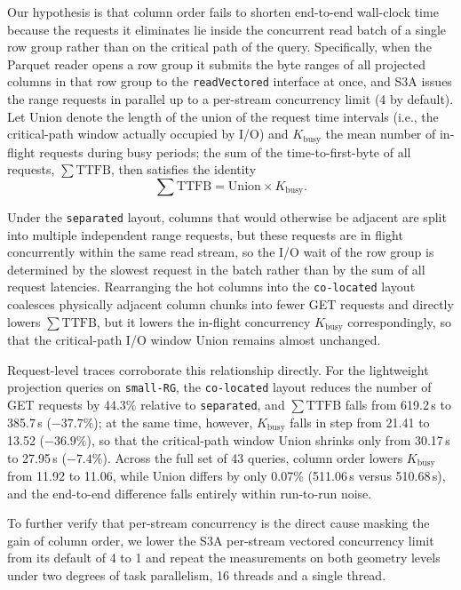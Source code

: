 Our hypothesis is that column order fails to shorten end-to-end wall-clock time
because the requests it eliminates lie inside the concurrent read batch of a
single row group rather than on the critical path of the query. Specifically,
when the Parquet reader opens a row group it submits the byte ranges of all
projected columns in that row group to the \texttt{readVectored} interface at
once, and S3A issues the range requests in parallel up to a per-stream
concurrency limit (4 by default). Let $\mathrm{Union}$ denote the length of the
union of the request time intervals (i.e., the critical-path window actually
occupied by I/O) and $K_{\mathrm{busy}}$ the mean number of in-flight requests
during busy periods; the sum of the time-to-first-byte of all requests,
$\sum \mathrm{TTFB}$, then satisfies the identity
$$
  \sum \mathrm{TTFB} = \mathrm{Union} \times K_{\mathrm{busy}}.
$$

Under the \texttt{separated} layout, columns that would otherwise be adjacent are
split into multiple independent range requests, but these requests are in
flight concurrently within the same read stream, so the I/O wait of the row
group is determined by the slowest request in the batch rather than by the sum
of all request latencies. Rearranging the hot columns into the
\texttt{co-located} layout coalesces physically adjacent column chunks into
fewer GET requests and directly lowers $\sum \mathrm{TTFB}$, but it lowers the
in-flight concurrency $K_{\mathrm{busy}}$ correspondingly, so that the
critical-path I/O window $\mathrm{Union}$ remains almost unchanged.

Request-level traces corroborate this relationship directly. For the lightweight
projection queries on \texttt{small-RG}, the \texttt{co-located} layout reduces
the number of GET requests by 44.3\% relative to \texttt{separated}, and
$\sum \mathrm{TTFB}$ falls from 619.2\,s to 385.7\,s ($-37.7\%$); at the same
time, however, $K_{\mathrm{busy}}$ falls in step from 21.41 to 13.52
($-36.9\%$), so that the critical-path window $\mathrm{Union}$ shrinks only from
30.17\,s to 27.95\,s ($-7.4\%$). Across the full set of 43 queries, column order
lowers $K_{\mathrm{busy}}$ from 11.92 to 11.06, while $\mathrm{Union}$ differs by
only 0.07\% (511.06\,s versus 510.68\,s), and the end-to-end difference falls
entirely within run-to-run noise.

To further verify that per-stream concurrency is the direct cause masking the
gain of column order, we lower the S3A per-stream vectored concurrency limit from
its default of 4 to 1 and repeat the measurements on both geometry levels under
two degrees of task parallelism, 16 threads and a single thread.

